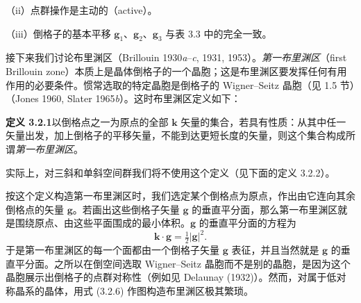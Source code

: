 \noindent（ii）点群操作是主动的（active）。

\noindent（iii）倒格子的基本平移 $\mathbf{g}_{1}$、$\mathbf{g}_{2}$、$\mathbf{g}_{3}$ 与表 3.3 中的完全一致。

接下来我们讨论布里渊区（Brillouin 1930\textit{a}--\textit{c}, 1931, 1953）。\textit{第一布里渊区}（first Brillouin zone）本质上是晶体倒格子的一个晶胞；这是布里渊区要发挥任何有用作用的必要条件。惯常选取的特定晶胞是倒格子的 Wigner--Seitz 晶胞（见 1.5 节）（Jones 1960, Slater 1965\textit{b}）。这时布里渊区定义如下：

\noindent\textbf{定义 3.2.1}\quad 以倒格点之一为原点的全部 $\mathbf{k}$ 矢量的集合，若具有性质：从其中任一矢量出发，加上倒格子的平移矢量，不能到达更短长度的矢量，则这个集合构成所谓\textit{第一布里渊区}。

实际上，对三斜和单斜空间群我们将不使用这个定义（见下面的定义 3.2.2）。

按这个定义构造第一布里渊区时，我们选定某个倒格点为原点，作出由它连向其余倒格点的矢量 $\mathbf{g}$。若画出这些倒格子矢量 $\mathbf{g}$ 的垂直平分面，那么第一布里渊区就是围绕原点、由这些平面围成的最小体积。$\mathbf{g}$ 的垂直平分面的方程为
\begin{equation*}
\mathbf{k} \cdot \mathbf{g} = \tfrac{1}{2}|\mathbf{g}|^{2}.
\tag{3.2.6}
\end{equation*}
于是第一布里渊区的每一个面都由一个倒格子矢量 $\mathbf{g}$ 表征，并且当然就是 $\mathbf{g}$ 的垂直平分面。之所以在倒空间选取 Wigner--Seitz 晶胞而不是别的晶胞，是因为这个晶胞展示出倒格子的点群对称性（例如见 Delaunay (1932)）。然而，对属于低对称晶系的晶体，用式 (3.2.6) 作图构造布里渊区极其繁琐。

